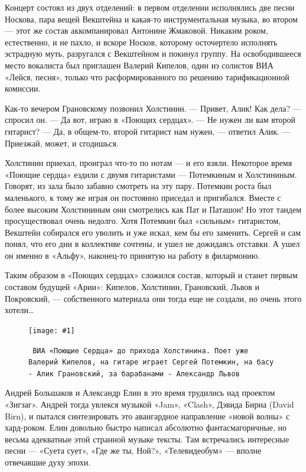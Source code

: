 \documentclass[16pt,a5paper]{book}
\newcommand{\myincludegraphics}[1]{\texttt{[image: \#1]}}
\begin{document}
Концерт состоял из двух отделений: в первом отделении исполнялись две песни Носкова, пара вещей Векштейна и какая-то
инструментальная музыка, во втором — этот же состав аккомпанировал Антонине Жмаковой. Никаким роком, естественно, и не
пахло, и вскоре Носков, которому осточертело исполнять эстрадную муть, разругался с Векштейном и покинул группу. На
освободившееся место вокалиста был приглашен Валерий Кипелов, один из солистов ВИА «Лейся, песня», только что
расформированного по решению тарификационной комиссии.

Как-то вечером Грановскому позвонил Холстинин.
— Привет, Алик! Как дела? — спросил он.
— Да вот, играю в «Поющих сердцах».
— Не нужен ли вам второй гитарист?
— Да, в общем-то, второй гитарист нам нужен, — ответил Алик. — Приезжай, может, и сгодишься.

Холстинин приехал, проиграл что-то по нотам — и его взяли. Некоторое время «Поющие сердца» ездили с двумя гитаристами —
Потемкиным и Холстининым. Говорят, из зала было забавно смотреть на эту пару. Потемкин роста был маленького, к тому же
играя он постоянно приседал и пригибался. Вместе с более высоким Холстининым они смотрелись как Пат и Паташон! Но этот
тандем просуществовал очень недолго. Хотя Потемкин был «сильным» гитаристом, Векштейн собирался его уволить и уже искал,
кем бы его заменить. Сергей и сам понял, что его дни в коллективе сочтены, и ушел не дожидаясь отставки. А ушел он
именно в «Альфу», наконец-то принятую на работу в филармонию.

Таким образом в «Поющих сердцах» сложился состав, который и станет первым составом будущей «Арии»: Кипелов, Холстинин,
Грановский, Львов и Покровский, — собственного материала они тогда еще не создали, но очень этого хотели\ldots

\begin{figure}[h]
    \centering
    \myincludegraphics{Image11}
    \caption{\texttt{
        ВИА «Поющие Сердца» до прихода Холстинина. Поет уже Валерий Кипелов, на гитаре играет Сергей Потемкин, на басу -
        Алик Грановский, за барабанами - Александр Львов
    }}
\end{figure}

Андрей Большаков и Александр Елин в это время трудились над проектом «Зигзаг». Андрей тогда увлекся музыкой «Jam»,
«Clash», Дэвида Бирна (David Birn), и пытался синтезировать это авангардное направление «новой волны» с хард-роком. Елин
довольно быстро написал абсолютно фантасмагоричные, но весьма адекватные этой странной музыке тексты. Там встречались
интересные песни — «Суета сует», «Где же ты, Ной?», «Телевидеобум» — вполне отвечавшие духу эпохи.
\end{document}
